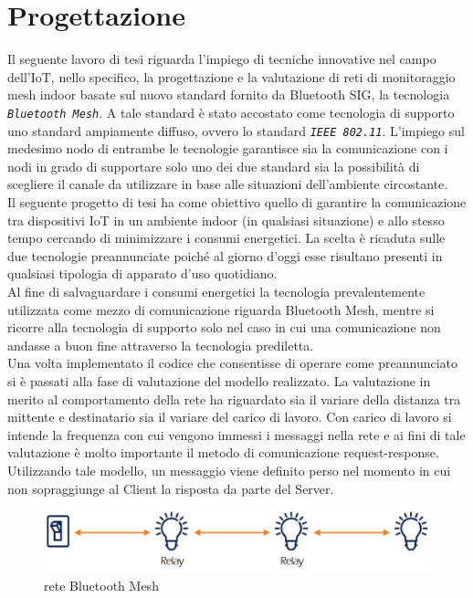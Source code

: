 \chapter{Progettazione}
\label{ch:progettazione}

Il seguente lavoro di tesi riguarda l'impiego di tecniche innovative nel campo dell'IoT, nello specifico, la progettazione e la valutazione di reti di monitoraggio mesh indoor basate sul nuovo standard fornito da Bluetooth SIG, la tecnologia \textit{\texttt{Bluetooth Mesh}}.
A tale standard è stato accostato come tecnologia di supporto uno standard ampiamente diffuso, ovvero lo standard \textit{\texttt{IEEE 802.11}}. L'impiego sul medesimo nodo di entrambe le tecnologie garantisce sia la comunicazione con i nodi in grado di supportare solo uno dei due standard sia la possibilità di scegliere il canale da utilizzare in base alle situazioni dell'ambiente circostante.\\

\noindent Il seguente progetto di tesi ha come obiettivo quello di garantire la comunicazione tra dispositivi IoT in un ambiente indoor (in qualsiasi situazione) e allo stesso tempo cercando di minimizzare i consumi energetici. La scelta è ricaduta sulle due tecnologie preannunciate poiché al giorno d'oggi esse risultano presenti in qualsiasi tipologia di apparato d'uso quotidiano. \\
Al fine di salvaguardare i consumi energetici la tecnologia prevalentemente utilizzata come mezzo di comunicazione riguarda Bluetooth Mesh, mentre si ricorre alla tecnologia di supporto solo nel caso in cui una comunicazione non andasse a buon fine attraverso la tecnologia prediletta.\\
Una volta implementato il codice che consentisse di operare come preannunciato si è passati alla fase di valutazione del modello realizzato. La valutazione in merito al comportamento della rete ha riguardato sia il variare della distanza tra mittente e destinatario sia il variare del carico di lavoro. Con carico di lavoro si intende la frequenza con cui vengono immessi i messaggi nella rete e ai fini di tale valutazione è molto importante il metodo di comunicazione request-response. Utilizzando tale modello, un messaggio viene definito perso nel momento in cui non sopraggiunge al Client la risposta da parte del Server.\\

\begin{figure}[!ht]
    \centering
    \includegraphics[width = \textwidth]{images/Mesh_network.png}
    \caption{rete Bluetooth Mesh}
    \label{fig:mesh_network}
\end{figure}

